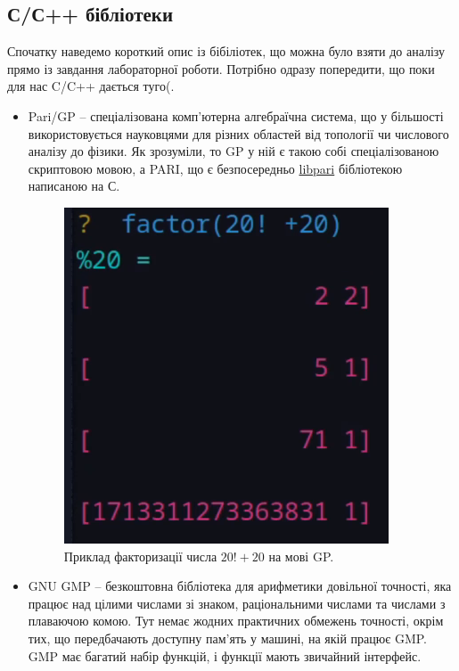 \subsection{С/С++ бібліотеки}
Спочатку наведемо короткий опис із бібіліотек, що можна було взяти до аналізу прямо із завдання лабораторної роботи. Потрібно одразу попередити, що поки для нас C/C++ дається туго(.

\begin{itemize}
	\item Pari/GP -- спеціалізована комп'ютерна алгебраїчна система, що у більшості використовується науковцями для різних областей від топології чи числового аналізу до фізики. Як зрозуміли, то GP у ній є такою собі спеціалізованою скриптовою мовою, а PARI, що є безпосередньо \href{https://pari.math.u-bordeaux.fr/pub/pari/manuals/2.7.6/libpari.pdf}{libpari} бібліотекою написаною на С.
		
	\begin{figure}[h]
    		\centering
    		\includegraphics[scale = 0.25]{Images/pari_gp}
    		\caption{Приклад факторизації числа $20! + 20$ на мові GP.}
    		\label{fig:}
	\end{figure}

	
	\item GNU GMP -- безкоштовна бібліотека для арифметики довільної точності, яка працює над цілими числами зі знаком, раціональними числами та числами з плаваючою комою. Тут немає жодних практичних обмежень точності, окрім тих, що передбачають доступну пам’ять у машині, на якій працює GMP. GMP  має багатий набір функцій, і функції мають звичайний інтерфейс.
	

\end{itemize}
